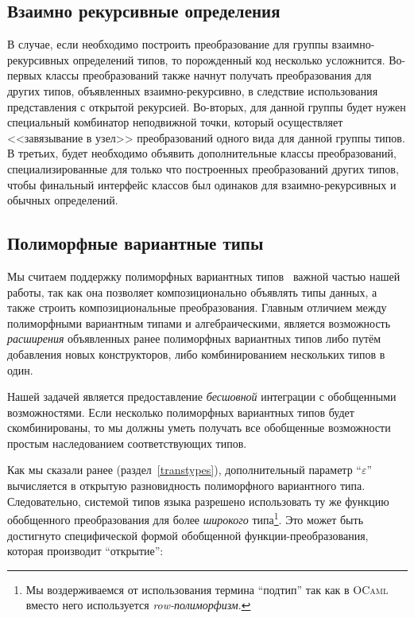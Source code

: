 

\subsection{Взаимно рекурсивные определения}
\label{murec}

В случае, если необходимо построить преобразование для группы взаимно-рекурсивных определений типов, то порожденный код несколько усложнится. Во-первых классы преобразований также начнут получать преобразования для других типов, объявленных взаимно-рекурсивно, в следствие использования представления с открытой рекурсией. Во-вторых, для данной группы будет нужен специальный комбинатор неподвижной точки, который осуществляет <<завязывание в узел>> преобразований одного вида для данной группы типов. В третьих, будет необходимо объявить дополнительные классы преобразований, специализированные для только что построенных преобразований других типов, чтобы финальный интерфейс классов был одинаков для взаимно-рекурсивных и обычных определений.



\subsection{Полиморфные вариантные типы}
\label{pv}

Мы считаем поддержку полиморфных вариантных типов~\cite{PolyVar,PolyVarReuse} важной частью нашей работы, так как она позволяет 
композиционально объявлять типы данных, а также строить композициональные преобразования.
Главным отличием между полиморфными вариантным типами и алгебраическими, является возможность
\emph{расширения} объявленных ранее полиморфных вариантных типов либо путём добавления новых конструкторов, либо комбинированием нескольких типов в один.

Нашей задачей является предоставление  \emph{бесшовной} интеграции с обобщенными возможностями. Если несколько полиморфных вариантных типов будет скомбинированы, то мы должны уметь получать все обобщенные возможности простым наследованием соответствующих типов.

Как мы сказали ранее (раздел~\ref{transtypes}), дополнительный параметр  ``$\varepsilon$'' вычисляется в открытую разновидность полиморфного вариантного типа. Следовательно, системой типов языка \OCaml{} разрешено использовать ту же функцию обобщенного преобразования для более \emph{широкого} типа\footnote{Мы воздерживаемся от использования термина ``подтип'' так как в \textsc{OCaml} вместо него используется \emph{row-полиморфизм}.}. 
Это может быть достигнуто специфической формой обобщенной функции-преобразования, которая производит ``открытие'':

